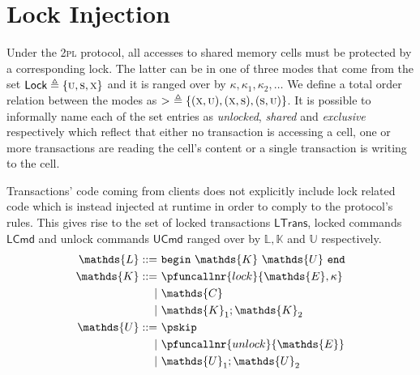 \section{Lock Injection}

Under the \textsc{2pl} protocol, all accesses to shared memory cells must be protected by a corresponding lock. The latter can be in one of three modes that come from the set $\mathsf{Lock} \triangleq \{ \textsc{u}, \textsc{s}, \textsc{x} \}$ and it is ranged over by $\kappa, \kappa_1, \kappa_2, \ldots$ We define a total order relation between the modes as $>\ \triangleq \{ (\textsc{x}, \textsc{u}), (\textsc{x}, \textsc{s}), (\textsc{s}, \textsc{u}) \}$. It is possible to informally name each of the set entries as \textit{unlocked}, \textit{shared} and \textit{exclusive} respectively which reflect that either no transaction is accessing a cell, one or more transactions are reading the cell's content or a single transaction is writing to the cell.

Transactions' code coming from clients does not explicitly include lock related code which is instead injected at runtime in order to comply to the protocol's rules. This gives rise to the set of locked transactions $\textsf{LTrans}$, locked commands $\textsf{LCmd}$ and unlock commands $\textsf{UCmd}$ ranged over by $\mathds{L}, \mathds{K}$ and $\mathds{U}$ respectively.
\begin{align*}
\mathds{L} ::=&
\ \mathtt{begin}\ \mathds{K}\ \mathds{U}\ \mathtt{end} \\
\mathds{K} ::=&
\ \pfuncallnr{lock}{\mathds{E}, \kappa} \\
|&\ \mathds{C} \\
|&\ \mathds{K}_1; \mathds{K}_2 \\
\mathds{U} ::=&
\ \pskip \\
|&\ \pfuncallnr{unlock}{\mathds{E}} \\
|&\ \mathds{U}_1; \mathds{U}_2
\end{align*}

